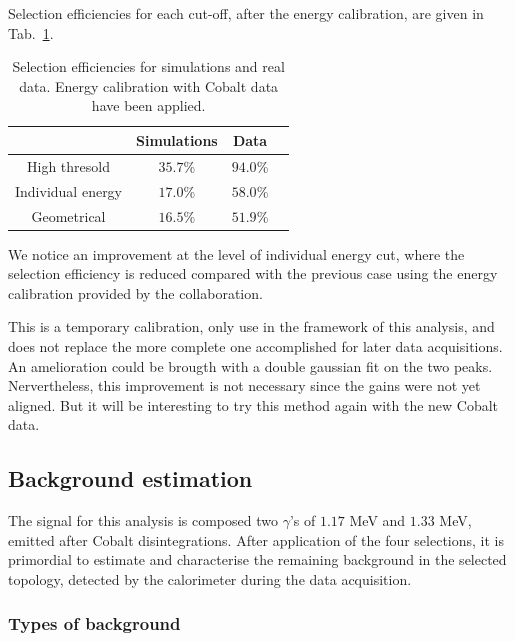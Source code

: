 Selection efficiencies for each cut-off, after the energy calibration, are given in Tab.~\ref{tab:Co_cut_eff_calib}.
\begin{table}[h]
  \centering
  \begin{tabular}{|c|c|c|c|}
    \hline
    & Simulations & Data \\
    \hline\hline
    High thresold & $35.7$\% & $94.0$\% \\
    Individual energy & $17.0$\% & $58.0$\% \\
    Geometrical & $16.5$\% & $51.9$\% \\
    \hline
  \end{tabular}
  \caption{Selection efficiencies for simulations and real data.
    Energy calibration with Cobalt data have been applied.
    \label{tab:Co_cut_eff_calib}}
\end{table}
We notice an improvement at the level of individual energy cut, where the selection efficiency is reduced compared with the previous case using the energy calibration provided by the collaboration.

This is a temporary calibration, only use in the framework of this analysis, and does not replace the more complete one accomplished for later data acquisitions.
An amelioration could be brougth with a double gaussian fit on the two peaks.
Nervertheless, this improvement is not necessary since the gains were not yet aligned.
But it will be interesting to try this method again with the new Cobalt data.


\subsection{Background estimation}
\label{subsec:bkg_estimation}

The signal for this analysis is composed two $\gamma$'s of $1.17$ MeV and $1.33$ MeV, emitted after Cobalt disintegrations.
After application of the four selections, it is primordial to estimate and characterise the remaining background in the selected topology, detected by the calorimeter during the data acquisition.

\subsubsection*{Types of background}

